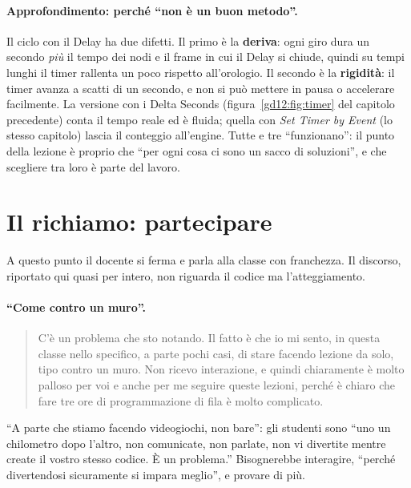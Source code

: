 \paragraph{Approfondimento: perché ``non è un buon metodo''.} Il ciclo con il
Delay ha due difetti. Il primo è la \textbf{deriva}: ogni giro dura un secondo
\emph{più} il tempo dei nodi e il frame in cui il Delay si chiude, quindi su
tempi lunghi il timer rallenta un poco rispetto all'orologio. Il secondo è la
\textbf{rigidità}: il timer avanza a scatti di un secondo, e non si può
mettere in pausa o accelerare facilmente. La versione con i Delta Seconds
(figura~\ref{gd12:fig:timer} del capitolo precedente) conta il tempo reale ed è
fluida; quella con \emph{Set Timer by Event} (lo stesso capitolo) lascia il
conteggio all'engine. Tutte e tre ``funzionano'': il punto della lezione è
proprio che ``per ogni cosa ci sono un sacco di soluzioni'', e che scegliere tra
loro è parte del lavoro.

\section{Il richiamo: partecipare}
\label{gd13:sec:richiamo}

A questo punto il docente si ferma e parla alla classe con franchezza. Il
discorso, riportato qui quasi per intero, non riguarda il codice ma
l'atteggiamento.

\paragraph{``Come contro un muro''.}
\begin{quote}
C'è un problema che sto notando. Il fatto è che io mi sento, in questa classe
nello specifico, a parte pochi casi, di stare facendo lezione da solo, tipo
contro un muro. Non ricevo interazione, e quindi chiaramente è molto palloso per
voi e anche per me seguire queste lezioni, perché è chiaro che fare tre ore di
programmazione di fila è molto complicato.
\end{quote}
``A parte che stiamo facendo videogiochi, non bare'': gli studenti sono ``uno un
chilometro dopo l'altro, non comunicate, non parlate, non vi divertite mentre
create il vostro stesso codice. È un problema.'' Bisognerebbe interagire,
``perché divertendosi sicuramente si impara meglio'', e provare di più.

